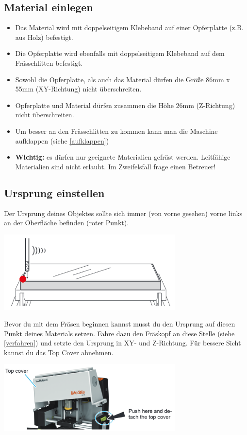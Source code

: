 \documentclass{\basedir/fablab-document}
\newcommand{\todo}[1]{\textbf{\color{red}{TODO: #1}}}
\begin{document}
\subsection{Material einlegen}
\begin{itemize}
	\item Das Material wird mit doppelseitigem Klebeband auf einer Opferplatte (z.B. aus Holz) befestigt.
	\item Die Opferplatte wird ebenfalls mit doppelseitigem Klebeband auf dem Frässchlitten befestigt.
	\item Sowohl die Opferplatte, als auch das Material dürfen die Größe 86mm x 55mm (XY-Richtung) nicht überschreiten.
	\item Opferplatte und Material dürfen zusammen die Höhe 26mm  (Z-Richtung) nicht überschreiten.
	\item Um besser an den Frässchlitten zu kommen kann man die Maschine aufklappen (siehe \ref{aufklappen})
	\item \textbf{Wichtig:} es dürfen nur geeignete Materialien gefräst werden. Leitfähige Materialien sind nicht erlaubt. Im Zweifelsfall frage einen Betreuer! 
\end{itemize}

\subsection{Ursprung einstellen}
Der Ursprung deines Objektes sollte sich immer (von vorne gesehen) vorne links an der Oberfläche befinden (roter Punkt). 
\begin{center}
\includegraphics[width=0.7\textwidth]{img/nullpunkt}
\end{center}
Bevor du mit dem Fräsen beginnen kannst musst du den Ursprung auf diesen Punkt deines Materials setzen. Fahre dazu den Fräskopf an diese Stelle (siehe \ref{verfahren}) und setzte den Ursprung in XY- und Z-Richtung. \todo{Bild von Controller} Für bessere Sicht kannst du das Top Cover abnehmen.
\begin{center}
\includegraphics[width=0.7\textwidth]{img/topcover}
\end{center}
\end{document}
